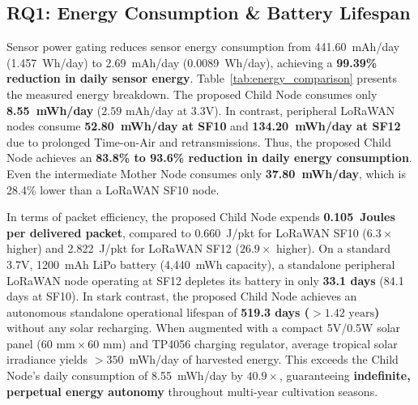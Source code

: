 \documentclass[conference]{IEEEtran}
\begin{document}
\subsection{RQ1: Energy Consumption \& Battery Lifespan}
Sensor power gating reduces sensor energy consumption from 441.60~mAh/day (1.457~Wh/day) to 2.69~mAh/day (0.0089~Wh/day), achieving a \textbf{99.39\% reduction in daily sensor energy}. Table~\ref{tab:energy_comparison} presents the measured energy breakdown. The proposed Child Node consumes only \textbf{8.55~mWh/day} ($2.59\text{ mAh/day}$ at 3.3V). In contrast, peripheral LoRaWAN nodes consume \textbf{52.80~mWh/day at SF10} and \textbf{134.20~mWh/day at SF12} due to prolonged Time-on-Air and retransmissions. Thus, the proposed Child Node achieves an \textbf{83.8\% to 93.6\% reduction in daily energy consumption}. Even the intermediate Mother Node consumes only \textbf{37.80~mWh/day}, which is 28.4\% lower than a LoRaWAN SF10 node.

In terms of packet efficiency, the proposed Child Node expends \textbf{0.105~Joules per delivered packet}, compared to 0.660~J/pkt for LoRaWAN SF10 ($6.3\times$ higher) and 2.822~J/pkt for LoRaWAN SF12 ($26.9\times$ higher). On a standard 3.7V, 1200~mAh LiPo battery (4,440~mWh capacity), a standalone peripheral LoRaWAN node operating at SF12 depletes its battery in only \textbf{33.1 days} (84.1 days at SF10). In stark contrast, the proposed Child Node achieves an autonomous standalone operational lifespan of \textbf{519.3 days ($>1.42\text{ years}$)} without any solar recharging. When augmented with a compact 5V/0.5W solar panel ($60\text{ mm} \times 60\text{ mm}$) and TP4056 charging regulator, average tropical solar irradiance yields $>350$~mWh/day of harvested energy. This exceeds the Child Node's daily consumption of 8.55~mWh/day by \textbf{$40.9\times$}, guaranteeing \textbf{indefinite, perpetual energy autonomy} throughout multi-year cultivation seasons.
\end{document}
